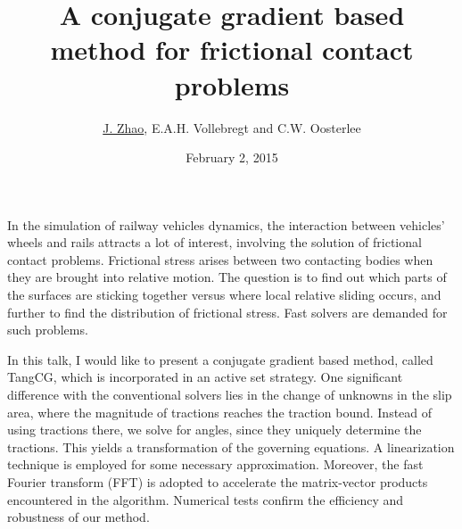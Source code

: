\documentclass{article}
\title{A conjugate gradient based method for frictional contact problems}
\author{\underline{J. Zhao}, E.A.H. Vollebregt and C.W. Oosterlee}
\affil{Delft Universiry of Technology}
\date{February 2, 2015}
\begin{document}
\maketitle

In the simulation of railway vehicles dynamics, the interaction between vehicles' wheels and rails attracts a lot of interest, involving the solution of frictional contact problems. Frictional stress arises between two contacting bodies when they are brought into relative motion. The question is to find out which parts of the surfaces are sticking together versus where local relative sliding occurs, and further to find the distribution of frictional stress. Fast solvers are demanded for such problems.


In this talk, I would like to present a conjugate gradient based method, called TangCG, which is incorporated in an active set strategy. One significant difference with the conventional solvers lies in the change of unknowns in the slip area, where the magnitude of tractions reaches the traction bound. Instead of using tractions there, we solve for angles, since they uniquely determine the tractions. This yields a transformation of the governing equations. A linearization technique is employed for some necessary approximation. Moreover, the fast Fourier transform (FFT) is adopted to accelerate the matrix-vector products encountered in the algorithm. Numerical tests confirm the efficiency and robustness of our method. 
\end{document}
